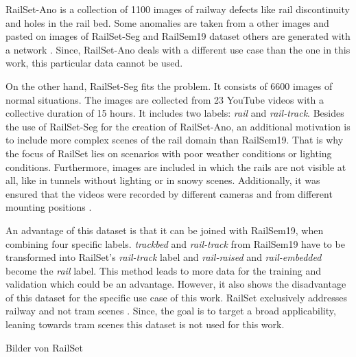RailSet-Ano is a collection of 1100 images of railway defects like rail discontinuity and holes in the rail bed. Some anomalies are taken from a other images and pasted on images of RailSet-Seg and RailSem19 dataset others are generated with a network \cite{railSet2022}. Since, RailSet-Ano deals with a different use case than the one in this work, this particular data cannot be used.

On the other hand, RailSet-Seg fits the problem. It consists of 6600 images of normal situations. The images are collected from 23 YouTube videos with a collective duration of 15 hours. It includes two labels: \textit{rail} and \textit{rail-track}. Besides the use of  RailSet-Seg for the creation of RailSet-Ano, an additional motivation is to include more complex scenes of the rail domain than RailSem19. That is why the focus of RailSet lies on scenarios with poor weather conditions or lighting conditions. Furthermore, images are included in which the rails are not visible at all, like in tunnels without lighting or in snowy scenes. Additionally, it was ensured that the videos were recorded by different cameras and from different mounting positions \cite{railSet2022} \cite{hadded2022application}. 

An advantage of this dataset is that it can be joined with RailSem19, when combining four specific labels. \textit{trackbed} and \textit{rail-track} from RailSem19 have to be transformed into RailSet's \textit{rail-track} label and \textit{rail-raised} and \textit{rail-embedded} become the \textit{rail} label. This method leads to more data for the training and validation which could be an advantage. However, it also shows the disadvantage of this dataset for the specific use case of this work. 
RailSet exclusively addresses railway and not tram scenes \cite{hadded2022application}. Since, the goal is to target a broad applicability, leaning towards tram scenes this dataset is not used for this work.



Bilder von RailSet



